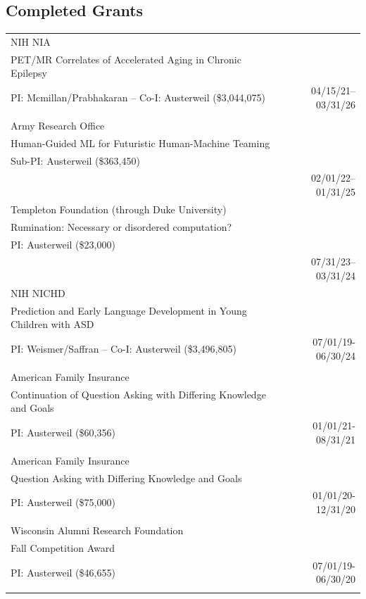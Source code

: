 \documentclass[a4paper,10pt]{article}
\begin{document}
\subsection{Completed Grants}
\vspace{-4mm}
\begin{longtabu} to \linewidth {Xr}
NIH NIA & \\
PET/MR Correlates of Accelerated Aging in Chronic Epilepsy & \\
PI: Mcmillan/Prabhakaran -- Co-I: Austerweil (\$3,044,075) & 04/15/21--03/31/26 \\ & \\

Army Research Office  &  \\
Human-Guided ML for Futuristic Human-Machine Teaming & \\
Sub-PI: Austerweil (\$363,450) \\ & 02/01/22--01/31/25 \\ 

Templeton Foundation (through Duke University) & \\
Rumination: Necessary or disordered computation? \\
PI: Austerweil (\$23,000) \\ & 07/31/23--03/31/24 \\

NIH NICHD &  \\
Prediction and Early Language Development in Young Children with ASD & \\
PI: Weismer/Saffran -- Co-I: Austerweil (\$3,496,805) &  07/01/19-06/30/24  \\ & \\

American Family Insurance & \\
Continuation of Question Asking with Differing Knowledge and Goals & \\
PI: Austerweil (\$60,356) & 01/01/21-08/31/21 \\ & \\

American Family Insurance & \\
Question Asking with Differing Knowledge and Goals & \\
PI: Austerweil (\$75,000) & 01/01/20-12/31/20 \\ & \\

Wisconsin Alumni Research Foundation & \\
Fall Competition Award & \\
PI: Austerweil (\$46,655) & 07/01/19-06/30/20  \\ &  \\


\end{longtabu}
\end{document}
